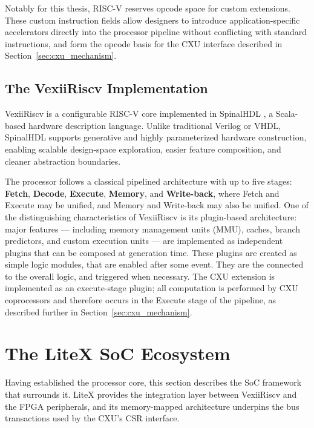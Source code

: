 Notably for this thesis, RISC-V reserves opcode space for custom extensions.
These custom instruction fields allow designers to introduce application-specific
accelerators directly into the processor pipeline without conflicting with standard
instructions, and form the opcode basis for the CXU interface described in
Section~\ref{sec:cxu_mechanism}.

\subsection{The VexiiRiscv Implementation}
\label{subsec:vexii}

VexiiRiscv \cite{VexiiRiscVGithub} is a configurable RISC-V core implemented in
SpinalHDL \cite{SpinalHDL2018}, a Scala-based hardware description language.
Unlike traditional Verilog or VHDL, SpinalHDL supports generative and highly
parameterized hardware construction, enabling scalable design-space exploration,
easier feature composition, and cleaner abstraction boundaries.

The processor follows a classical pipelined architecture with up to five stages:
\textbf{Fetch}, \textbf{Decode}, \textbf{Execute}, \textbf{Memory}, and \textbf{Write-back},
where Fetch and Execute may be unified, and Memory and Write-back may also be unified.
One of the distinguishing characteristics of VexiiRiscv is its plugin-based architecture:
major features --- including memory management units (MMU), caches, branch predictors,
and custom execution units --- are implemented as independent plugins that can be composed
at generation time. These plugins are created as simple logic modules, that are enabled
after some event. They are the connected to the overall logic, and triggered when necessary.
The CXU extension is implemented as an execute-stage plugin; all computation is performed by
CXU coprocessors and therefore occurs in the Execute stage of the pipeline, as described
further in Section~\ref{sec:cxu_mechanism}.

\section{The LiteX SoC Ecosystem}
\label{sec:litex_ecosystem}

Having established the processor core, this section describes the SoC framework that
surrounds it.
LiteX provides the integration layer between VexiiRiscv and the FPGA peripherals,
and its memory-mapped architecture underpins the bus transactions used by the CXU's
CSR interface.

